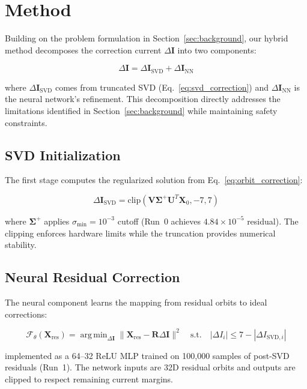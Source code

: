 \documentclass{article} %
\DeclareMathOperator*{\argmin}{arg\,min}
\begin{document}
\section{Method}
\label{sec:method}

Building on the problem formulation in Section~\ref{sec:background}, our hybrid method decomposes the correction current $\Delta\mathbf{I}$ into two components:

\begin{equation}
    \Delta\mathbf{I} = \Delta\mathbf{I}_{\text{SVD}} + \Delta\mathbf{I}_{\text{NN}}
    \label{eq:hybrid_decomposition}
\end{equation}

where $\Delta\mathbf{I}_{\text{SVD}}$ comes from truncated SVD (Eq.~\ref{eq:svd_correction}) and $\Delta\mathbf{I}_{\text{NN}}$ is the neural network's refinement. This decomposition directly addresses the limitations identified in Section~\ref{sec:background} while maintaining safety constraints.

\subsection{SVD Initialization}
The first stage computes the regularized solution from Eq.~\ref{eq:orbit_correction}:

\begin{equation}
    \Delta\mathbf{I}_{\text{SVD}} = \text{clip}(\mathbf{V}\mathbf{\Sigma}^+\mathbf{U}^T\mathbf{X}_0, -7, 7)
\end{equation}

where $\mathbf{\Sigma}^+$ applies $\sigma_{\text{min}}=10^{-3}$ cutoff (Run~0 achieves $4.84 \times 10^{-5}$ residual). The clipping enforces hardware limits while the truncation provides numerical stability.

\subsection{Neural Residual Correction}
The neural component learns the mapping from residual orbits to ideal corrections:

\begin{equation}
    \mathcal{F}_\theta(\mathbf{X}_{\text{res}}) = \argmin_{\Delta\mathbf{I}} \|\mathbf{X}_{\text{res}} - \mathbf{R}\Delta\mathbf{I}\|^2 \quad \text{s.t.} \quad |\Delta I_i| \leq 7 - |\Delta I_{\text{SVD},i}|
\end{equation}

implemented as a 64--32 ReLU MLP trained on 100,000 samples of post-SVD residuals (Run~1). The network inputs are 32D residual orbits and outputs are clipped to respect remaining current margins.
\end{document}
